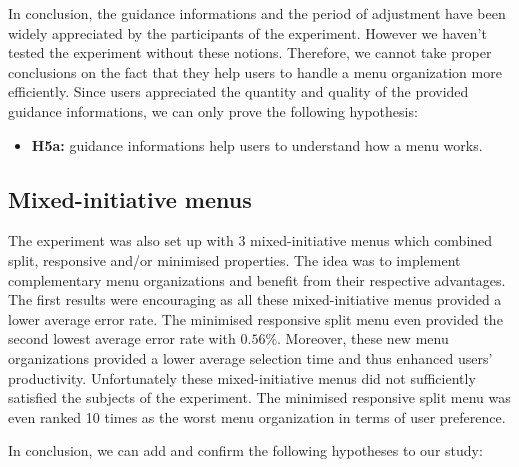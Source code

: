 In conclusion, the guidance informations and the period of adjustment have been 
widely appreciated by the participants of the experiment. However we haven't 
tested the experiment without these notions. Therefore, we cannot take proper 
conclusions on the fact that they help users to handle a menu organization more 
efficiently. Since users appreciated the quantity and quality of the provided 
guidance informations, we can only prove the following hypothesis:

\begin{itemize}
 \item \textbf{H5a:} guidance informations help users to understand how a menu 
works.
\end{itemize}

\begin{figure}[!ht]
    
    \label{fig:guidance}
\end{figure}

\begin{figure}[!ht]
    
    \label{fig:period}
\end{figure}

\subsection{Mixed-initiative menus}
The experiment was also set up with 3 mixed-initiative menus which combined 
split, responsive and/or minimised properties. The idea was to implement 
complementary menu organizations and benefit from their respective advantages. 
The first results were encouraging as all these mixed-initiative menus 
provided a lower average error rate. The minimised responsive split menu even 
provided the second lowest average error rate with $0.56\%$. Moreover, these 
new menu organizations provided a lower average selection time and thus 
enhanced users' productivity. Unfortunately these mixed-initiative menus did 
not sufficiently satisfied the subjects of the experiment. The minimised 
responsive split menu was even ranked 10 times as the worst menu organization in 
terms of user preference.\newline

In conclusion, we can add and confirm the following hypotheses to our study:


